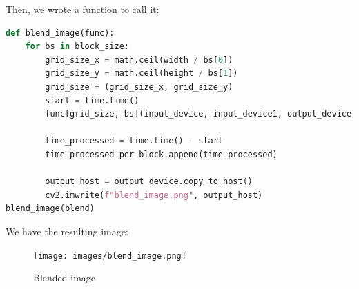 \documentclass[12pt]{article}
\begin{document}
\noindent
Then, we wrote a function to call it:
\begin{lstlisting}[language=Python]
def blend_image(func):
    for bs in block_size:
        grid_size_x = math.ceil(width / bs[0])
        grid_size_y = math.ceil(height / bs[1])
        grid_size = (grid_size_x, grid_size_y)
        start = time.time()
        func[grid_size, bs](input_device, input_device1, output_device, c)

        time_processed = time.time() - start
        time_processed_per_block.append(time_processed)

        output_host = output_device.copy_to_host()
        cv2.imwrite(f"blend_image.png", output_host)
blend_image(blend)
\end{lstlisting}

\noindent
We have the resulting image:
\begin{figure}[H]
\centering
    \texttt{[image: images/blend\_image.png]}
    \caption{Blended image}
\end{figure}
\end{document}
